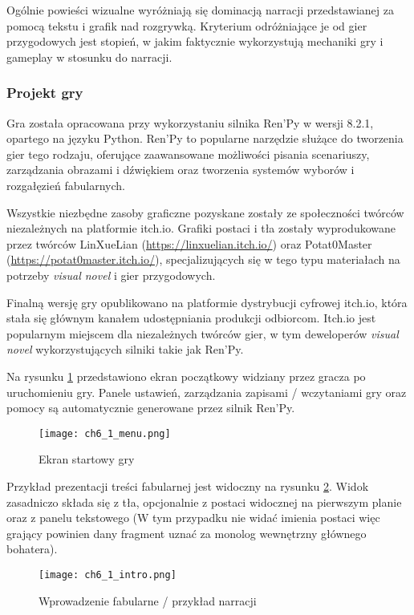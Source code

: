 Ogólnie powieści wizualne wyróżniają się dominacją narracji przedstawianej za pomocą tekstu i grafik nad
rozgrywką. Kryterium odróżniające je od gier przygodowych jest stopień, w jakim faktycznie
wykorzystują mechaniki gry i gameplay w stosunku do narracji\cite{tvtropes_visual_novel}.

\subsubsection*{Projekt gry}

Gra została opracowana przy wykorzystaniu silnika Ren'Py w wersji 8.2.1, opartego na języku Python.
Ren'Py to popularne narzędzie służące do tworzenia gier tego rodzaju, oferujące zaawansowane
możliwości pisania scenariuszy, zarządzania obrazami i dźwiękiem oraz tworzenia systemów wyborów
i rozgałęzień fabularnych.

Wszystkie niezbędne zasoby graficzne pozyskane zostały ze społeczności twórców niezależnych na
platformie itch.io. Grafiki postaci i tła zostały wyprodukowane przez twórców
LinXueLian (\url{https://linxuelian.itch.io/}) oraz Potat0Master (\url{https://potat0master.itch.io/}),
specjalizujących się w tego typu materiałach na potrzeby \textit{visual novel} i gier przygodowych.

Finalną wersję gry opublikowano na platformie dystrybucji cyfrowej itch.io, która stała się
głównym kanałem udostępniania produkcji odbiorcom. Itch.io jest popularnym miejscem dla niezależnych
twórców gier, w tym deweloperów \textit{visual novel} wykorzystujących silniki takie jak Ren'Py.

Na rysunku \ref{fig:ch6_1_menu} przedstawiono ekran początkowy widziany przez gracza po uruchomieniu
gry. Panele ustawień, zarządzania zapisami / wczytaniami gry oraz pomocy są automatycznie generowane
przez silnik Ren'Py.

\begin{figure}[h!]
    \centering
    \texttt{[image: ch6\_1\_menu.png]}
    \caption{Ekran startowy gry}
    \label{fig:ch6_1_menu}
\end{figure}

\newpage
Przykład prezentacji treści fabularnej jest widoczny na rysunku \ref{fig:ch6_1_intro}. Widok
zasadniczo składa się z tła, opcjonalnie z postaci widocznej na pierwszym planie oraz z panelu
tekstowego (W tym przypadku nie widać imienia postaci więc grający powinien dany fragment uznać
za monolog wewnętrzny głównego bohatera).

\begin{figure}[h!]
    \centering
    \texttt{[image: ch6\_1\_intro.png]}
    \caption{Wprowadzenie fabularne / przykład narracji}
    \label{fig:ch6_1_intro}
\end{figure}

